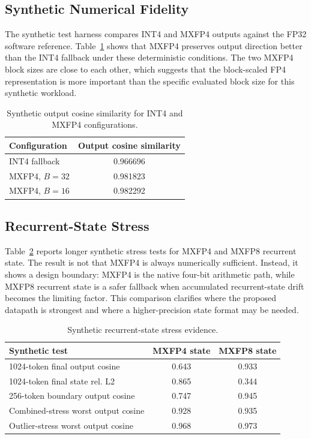 \documentclass[conference]{IEEEtran}
\begin{document}
\subsection{Synthetic Numerical Fidelity}
The synthetic test harness compares INT4 and MXFP4 outputs against the FP32 software reference. Table~\ref{tab:accuracy_results} shows that MXFP4 preserves output direction better than the INT4 fallback under these deterministic conditions. The two MXFP4 block sizes are close to each other, which suggests that the block-scaled FP4 representation is more important than the specific evaluated block size for this synthetic workload.

\begin{table}[t]
\centering
\caption{Synthetic output cosine similarity for INT4 and MXFP4 configurations.}
\label{tab:accuracy_results}
\footnotesize
\begin{tabularx}{\linewidth}{Xc}
\toprule
Configuration & Output cosine similarity \\
\midrule
INT4 fallback & 0.966696 \\
MXFP4, $B=32$ & 0.981823 \\
MXFP4, $B=16$ & 0.982292 \\
\bottomrule
\end{tabularx}
\end{table}

\subsection{Recurrent-State Stress}
Table~\ref{tab:state_stress_results} reports longer synthetic stress tests for MXFP4 and MXFP8 recurrent state. The result is not that MXFP4 is always numerically sufficient. Instead, it shows a design boundary: MXFP4 is the native four-bit arithmetic path, while MXFP8 recurrent state is a safer fallback when accumulated recurrent-state drift becomes the limiting factor. This comparison clarifies where the proposed datapath is strongest and where a higher-precision state format may be needed.

\begin{table}[t]
\centering
\caption{Synthetic recurrent-state stress evidence.}
\label{tab:state_stress_results}
\footnotesize
\begin{tabularx}{\linewidth}{Xcc}
\toprule
Synthetic test & MXFP4 state & MXFP8 state \\
\midrule
1024-token final output cosine & 0.643 & 0.933 \\
1024-token final state rel. L2 & 0.865 & 0.344 \\
256-token boundary output cosine & 0.747 & 0.945 \\
Combined-stress worst output cosine & 0.928 & 0.935 \\
Outlier-stress worst output cosine & 0.968 & 0.973 \\
\bottomrule
\end{tabularx}
\end{table}
\end{document}
